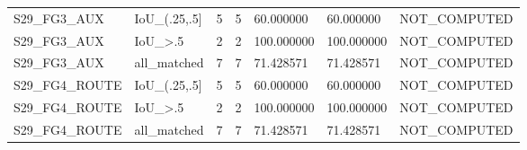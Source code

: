\begin{tabular}{lllllll}
S29\_FG3\_AUX & IoU\_(.25,.5] & 5 & 5 & 60.000000 & 60.000000 & NOT\_COMPUTED \\
S29\_FG3\_AUX & IoU\_>.5 & 2 & 2 & 100.000000 & 100.000000 & NOT\_COMPUTED \\
S29\_FG3\_AUX & all\_matched & 7 & 7 & 71.428571 & 71.428571 & NOT\_COMPUTED \\
S29\_FG4\_ROUTE & IoU\_(.25,.5] & 5 & 5 & 60.000000 & 60.000000 & NOT\_COMPUTED \\
S29\_FG4\_ROUTE & IoU\_>.5 & 2 & 2 & 100.000000 & 100.000000 & NOT\_COMPUTED \\
S29\_FG4\_ROUTE & all\_matched & 7 & 7 & 71.428571 & 71.428571 & NOT\_COMPUTED \\
\bottomrule
\end{tabular}
